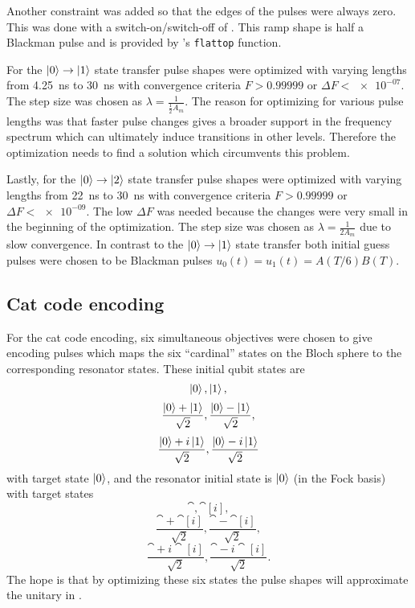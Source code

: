 \documentclass[main.tex]{subfiles}
\begin{document}
Another constraint was added so that the edges of the pulses were always zero.
This was done with a switch-on/switch-off of .
This ramp shape is half a Blackman pulse and is provided by \krotov{}'s \texttt{flattop} function.

For the \(\ket{0}\rightarrow\ket{1}\) state transfer pulse shapes were optimized with varying lengths from \SI{4.25}{\nano\second} to \SI{30}{\nano\second} with convergence criteria \(F>0.99999\) or \(\Delta F < \num{e-07}\).
The step size was chosen as \(\lambda = \frac{1}{\frac{1}{2}A_{m}}\).
The reason for optimizing for various pulse lengths was that faster pulse changes gives a broader support in the frequency spectrum which can ultimately induce transitions in other levels.
Therefore the optimization needs to find a solution which circumvents this problem.

Lastly, for the \(\ket{0}\rightarrow\ket{2}\) state transfer pulse shapes were optimized with varying lengths from \SI{22}{\nano\second} to \SI{30}{\nano\second} with convergence criteria \(F>0.99999\) or \(\Delta F < \num{e-09}\).
The low \(\Delta F\) was needed because the changes were very small in the beginning of the optimization.
The step size was chosen as \(\lambda = \frac{1}{2A_{m}}\) due to slow convergence.
In contrast to the \(\ket{0}\rightarrow\ket{1}\) state transfer both initial guess pulses were chosen to be Blackman pulses \(u_0(t) = u_1(t) = A(T/6)B(T)\).

\subsection{Cat code encoding}
For the cat code encoding, six simultaneous objectives were chosen to give encoding pulses which maps the six ``cardinal'' states on the Bloch sphere to the corresponding resonator states.
These initial qubit states are
\[ \ket{0}, \ket{1},\]
\[ \frac{\ket{0}+\ket{1}}{\sqrt{2}}, \frac{\ket{0}-\ket{1}}{\sqrt{2}},\]
\[ \frac{\ket{0}+i\ket{1}}{\sqrt{2}}, \frac{\ket{0}-i\ket{1}}{\sqrt{2}} \]
with target state \(\ket{0}\),
and the resonator initial state is \(\ket{0}\) (in the Fock basis) with target states
\[ \cat{}, \cat[i]{},\]
\[ \frac{\cat{}+\cat[i]{}}{\sqrt{2}}, \frac{\cat{}-\cat[i]{}}{\sqrt{2}},\]
\[ \frac{\cat{}+i\cat[i]{}}{\sqrt{2}}, \frac{\cat{}-i\cat[i]{}}{\sqrt{2}}. \]
The hope is that by optimizing these six states the pulse shapes will approximate the unitary in .
\end{document}
